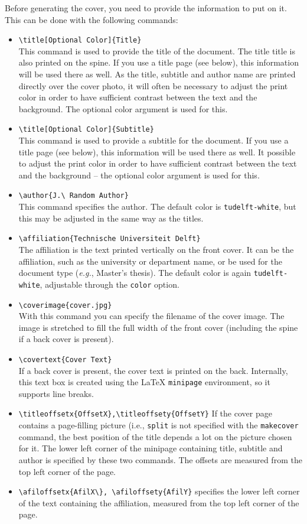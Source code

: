 Before generating the cover, you need to provide the information to put on it. This can be done with the following commands:
\begin{itemize}
    \item\verb|\title[Optional Color]{Title}| \\
    This command is used to provide the title of the document. The title
    title is also printed on the spine. If you use a title page (see below), this information will be used there as well.
    As the title, subtitle and author name are printed directly over the cover photo, it will often be necessary to adjust the print color in order to have
    sufficient contrast between the text and the background. The optional color argument is used for this.
    \item\verb|\title[Optional Color]{Subtitle}| \\
    This command is used to provide a subtitle for the document. If you use a title page (see below), this information will be used there as well.
    It possible to adjust the print color in order to have
    sufficient contrast between the text and the background -- the optional color argument is used for this.
    \item\verb|\author{J.\ Random Author}| \\
    This command specifies the author. The default color is \texttt{tudelft-white}, but this may be adjusted in the same way as the titles.
    \item\verb|\affiliation{Technische Universiteit Delft}| \\
    The affiliation is the text printed vertically on the front cover. It can be the affiliation, such as the university or department name, or be used for the document type (\emph{e.g.}, Master's thesis). The default color is again \texttt{tudelft-white}, adjustable through the \texttt{color} option.
    \item\verb|\coverimage{cover.jpg}| \\
    With this command you can specify the filename of the cover image. The image is stretched to fill the full width of the front cover (including the spine if a back cover is present).
    \item\verb|\covertext{Cover Text}| \\
    If a back cover is present, the cover text is printed on the back. Internally, this text box is created using the \LaTeX{} \texttt{minipage} environment, so it supports line breaks.
    \item\verb|\titleoffsetx{OffsetX},\titleoffsety{OffsetY}|
    If the cover page contains a page-filling picture (i.e., \texttt{split} is not specified with the \texttt{makecover} command, the best position of the title depends a lot on the picture chosen for it. The lower left corner of the minipage containing title, subtitle and author is
    specified by these two commands. The offsets are measured from the top left corner of the page.
    \item\verb|\afiloffsetx{AfilX\}, \afiloffsety{AfilY}|
    specifies the lower left corner of the text containing the affiliation, measured from the top left corner of the page.
\end{itemize}

